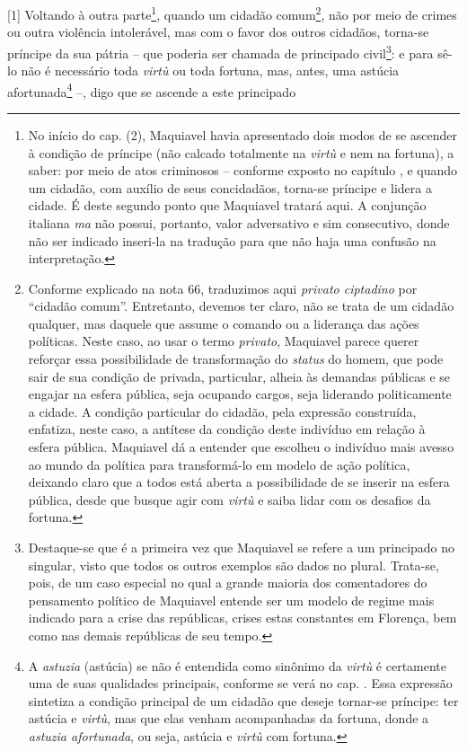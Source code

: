 {[}1{]} Voltando à outra parte\footnote{No início do cap.  (2),
  Maquiavel havia apresentado dois modos de se ascender à condição de
  príncipe (não calcado totalmente na \emph{virtù} e nem na fortuna), a
  saber: por meio de atos criminosos -- conforme exposto no capítulo
  , e quando um cidadão, com auxílio de seus concidadãos, torna-se
  príncipe e lidera a cidade. É deste segundo ponto que Maquiavel
  tratará aqui. A conjunção italiana \emph{ma} não possui, portanto,
  valor adversativo e sim consecutivo, donde não ser indicado inseri-la
  na tradução para que não haja uma confusão na interpretação.}, quando
um cidadão comum\footnote{Conforme explicado na nota 66, traduzimos aqui
  \emph{privato ciptadino} por ``cidadão comum''. Entretanto, devemos
  ter claro, não se trata de um cidadão qualquer, mas daquele que assume
  o comando ou a liderança das ações políticas. Neste caso, ao usar o
  termo \emph{privato}, Maquiavel parece querer reforçar essa
  possibilidade de transformação do \emph{status} do homem, que pode
  sair de sua condição de privada, particular, alheia às demandas
  públicas e se engajar na esfera pública, seja ocupando cargos, seja
  liderando politicamente a cidade. A condição particular do cidadão,
  pela expressão construída, enfatiza, neste caso, a antítese da
  condição deste indivíduo em relação à esfera pública. Maquiavel dá a
  entender que escolheu o indivíduo mais avesso ao mundo da política
  para transformá-lo em modelo de ação política, deixando claro que a
  todos está aberta a possibilidade de se inserir na esfera pública,
  desde que busque agir com \emph{virtù} e saiba lidar com os desafios
  da fortuna.}, não por meio de crimes ou outra violência intolerável,
mas com o favor dos outros cidadãos, torna-se príncipe da sua pátria --
que poderia ser chamada de principado civil\footnote{Destaque-se que é a
  primeira vez que Maquiavel se refere a um principado no singular,
  visto que todos os outros exemplos são dados no plural. Trata-se,
  pois, de um caso especial no qual a grande maioria dos comentadores do
  pensamento político de Maquiavel entende ser um modelo de regime mais
  indicado para a crise das repúblicas, crises estas constantes em
  Florença, bem como nas demais repúblicas de seu tempo.}: e para sê-lo
não é necessário toda \emph{virtù} ou toda fortuna, mas, antes, uma
astúcia afortunada\footnote{A \emph{astuzia} (astúcia) se não é
  entendida como sinônimo da \emph{virtù} é certamente uma de suas
  qualidades principais, conforme se verá no cap. . Essa expressão
  sintetiza a condição principal de um cidadão que deseje tornar-se
  príncipe: ter astúcia e \emph{virtù}, mas que elas venham acompanhadas
  da fortuna, donde a \emph{astuzia afortunada}, ou seja, astúcia e
  \emph{virtù} com fortuna.} --, digo que se ascende a este principado
